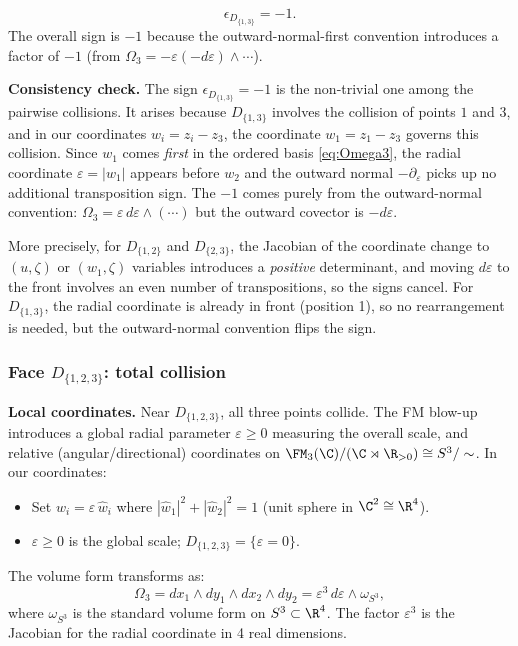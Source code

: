 \begin{equation}
\label{eq:eps-D13}
\boxed{\epsilon_{D_{\{1,3\}}} = -1.}
\end{equation}
The overall sign is $-1$ because the outward-normal-first convention introduces a factor of $-1$ (from $\Omega_3 = -\varepsilon(-d\varepsilon)\wedge\cdots$).

\noindent\textbf{Consistency check.} The sign $\epsilon_{D_{\{1,3\}}} = -1$ is the non-trivial one among the pairwise collisions. It arises because $D_{\{1,3\}}$ involves the collision of points $1$ and $3$, and in our coordinates $w_i = z_i - z_3$, the coordinate $w_1 = z_1 - z_3$ governs this collision. Since $w_1$ comes \emph{first} in the ordered basis \eqref{eq:Omega3}, the radial coordinate $\varepsilon = |w_1|$ appears before $w_2$ and the outward normal $-\partial_\varepsilon$ picks up no additional transposition sign. The $-1$ comes purely from the outward-normal convention: $\Omega_3 = \varepsilon\,d\varepsilon\wedge(\cdots)$ but the outward covector is $-d\varepsilon$.

More precisely, for $D_{\{1,2\}}$ and $D_{\{2,3\}}$, the Jacobian of the coordinate change to $(u,\zeta)$ or $(w_1,\zeta)$ variables introduces a \emph{positive} determinant, and moving $d\varepsilon$ to the front involves an even number of transpositions, so the signs cancel. For $D_{\{1,3\}}$, the radial coordinate is already in front (position 1), so no rearrangement is needed, but the outward-normal convention flips the sign.

\subsubsection{\texorpdfstring{Face $D_{\{1,2,3\}}$: total collision}{Face D123: total collision}}

\textbf{Local coordinates.} Near $D_{\{1,2,3\}}$, all three points collide. The FM blow-up introduces a global radial parameter $\varepsilon \ge 0$ measuring the overall scale, and relative (angular/directional) coordinates on $\FM_3(\C)/(\C\rtimes\R_{>0}) \cong S^3/\sim$. In our coordinates:
\begin{itemize}
\item Set $w_i = \varepsilon\,\hat{w}_i$ where $|\hat{w}_1|^2 + |\hat{w}_2|^2 = 1$ (unit sphere in $\C^2 \cong \R^4$).
\item $\varepsilon \ge 0$ is the global scale; $D_{\{1,2,3\}} = \{\varepsilon = 0\}$.
\end{itemize}
The volume form transforms as:
\[
\Omega_3 = dx_1\wedge dy_1\wedge dx_2\wedge dy_2 = \varepsilon^3\,d\varepsilon\wedge \omega_{S^3},
\]
where $\omega_{S^3}$ is the standard volume form on $S^3 \subset \R^4$. The factor $\varepsilon^3$ is the Jacobian for the radial coordinate in 4 real dimensions.

